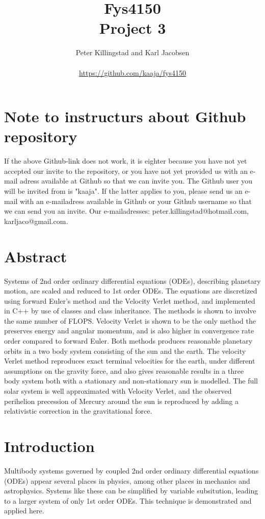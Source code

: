\documentclass{article}
\title{Fys4150\\Project 3\\ }
\author{Peter Killingstad and Karl Jacobsen\\
\\
\url{https://github.com/kaaja/fys4150}}
\begin{document}
	
\maketitle



\section*{Note to instructurs about Github repository}
If the above Github-link does not work, it is eighter because you have not yet accepted our invite to the repository, or you have not yet provided us with an e-mail adress available at Github so that we can invite you. The Github user you will be invited from is "kaaja". If the latter applies to you, please send us an e-mail with an e-mailadress available in Github or your Github username so that we can send you an invite. Our e-mailadresses: peter.killingstad@hotmail.com, karljaco@gmail.com.



\section*{Abstract}
Systems of 2nd order ordinary differential equations (ODEs), describing planetary motion, are scaled and reduced to 1st order ODEs. The equations are discretized using forward Euler's method and the Velocity Verlet method, and implemented in C++ by use of classes and class inheritance. The methods is shown to involve the same number of FLOPS. Velocity Verlet is shown to be the only method the preserves energy and angular momentum, and is also higher in convergence rate order compared to forward Euler. Both methods produces reasonable planetary orbits in a two body system consisting of the sun and the earth. The velocity Verlet method reproduces exact terminal velocities for the earth, under different assumptions on the gravity force, and also gives reasonable results in a three body system both with a stationary and non-stationary sun is modelled. The full solar system is well approximated with Velocity Verlet, and the observed perihelion precession of Mercury around the sun is reproduced by adding a relativistic correction in the gravitational force.


\section{Introduction}
Multibody systems governed by coupled 2nd order ordinary differential equations (ODEs) appear several places in physics, among other places in mechanics and astrophysics. Systems like these can be simplified by variable subsitution, leading to a larger system of only 1st order ODEs. This technique is demonstrated and applied here.\\
\end{document}
